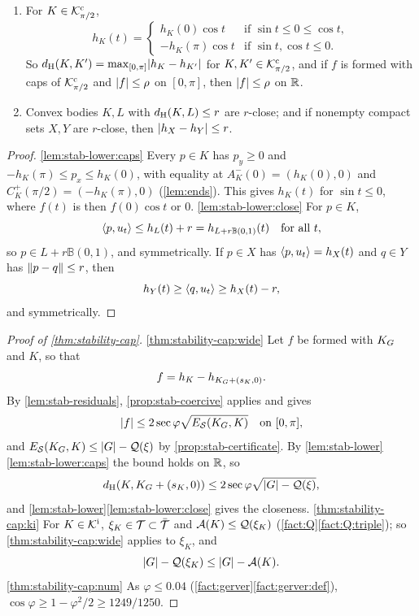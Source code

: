 \begin{lemma}\label{lem:stab-lower}
\begin{enumerate}[label=(\alph*)]
\item\label{lem:stab-lower:caps} For $K\in\mathcal{K}^{\mathrm{c}}_{\pi/2}$,
\[
  h_K(t)=
  \begin{cases}
    h_K(0)\cos t & \text{if }\sin t\le0\le\cos t,\\
    -h_K(\pi)\cos t & \text{if }\sin t,\cos t\le0.
  \end{cases}
\]
So $d_{\mathrm{H}}(K,K')=\max_{[0,\pi]}\lvert h_K-h_{K'}\rvert$ for $K,K'\in\mathcal{K}^{\mathrm{c}}_{\pi/2}$, and if
$f$ is formed with caps of $\mathcal{K}^{\mathrm{c}}_{\pi/2}$ and $\lvert f\rvert\le\rho$ on $[0,\pi]$, then
$\lvert f\rvert\le\rho$ on $\mathbb{R}$.
\item\label{lem:stab-lower:close} Convex bodies $K,L$ with $d_{\mathrm{H}}(K,L)\le r$
are $r$-close; and if nonempty compact sets $X,Y$ are $r$-close, then
$\lvert h_X-h_Y\rvert\le r$.
\end{enumerate}
\end{lemma}

\begin{proof}
\ref{lem:stab-lower:caps} Every $p\in K$ has $p_y\ge0$ and
$-h_K(\pi)\le p_x\le h_K(0)$, with equality at $A^-_K(0)=(h_K(0),0)$ and
$C^+_K(\pi/2)=(-h_K(\pi),0)$ (\cref{lem:ends}). This gives $h_K(t)$ for
$\sin t\le0$, where $f(t)$ is then $f(0)\cos t$ or $0$.
\ref{lem:stab-lower:close} For $p\in K$,
\[
  \langle p,u_t\rangle\le h_L(t)+r=h_{L+r\mathbb B(0,1)}(t)\quad\text{for all }t,
\]
so $p\in L+r\mathbb B(0,1)$, and symmetrically. If $p\in X$ has
$\langle p,u_t\rangle=h_X(t)$ and $q\in Y$ has $\lVert p-q\rVert\le r$, then
\[
  h_Y(t)\ge\langle q,u_t\rangle\ge h_X(t)-r,
\]
and symmetrically.
\end{proof}

\begin{proof}[Proof of \cref{thm:stability-cap}]
\ref{thm:stability-cap:wide} Let $f$ be formed with $K_G$ and $K$, so that
\[
  f=h_K-h_{K_G+(s_K,0)}.
\]
By \cref{lem:stab-residuals}, \cref{prop:stab-coercive} applies and gives
\[
  \lvert f\rvert\le2\sec\varphi\sqrt{E_{\mathcal{S}}(K_G,K)}\quad\text{on }[0,\pi],
\]
and $E_{\mathcal{S}}(K_G,K)\le\lvert G\rvert-\mathcal{Q}(\xi)$ by \cref{prop:stab-certificate}. By
\cref{lem:stab-lower}\ref{lem:stab-lower:caps} the bound holds on $\mathbb{R}$, so
\[
  d_{\mathrm{H}}(K,K_G+(s_K,0))\le2\sec\varphi\sqrt{\lvert G\rvert-\mathcal{Q}(\xi)},
\]
and \cref{lem:stab-lower}\ref{lem:stab-lower:close} gives the closeness.
\ref{thm:stability-cap:ki} For $K\in\mathcal{K}^{\mathrm{i}}$, $\xi_K\in\mathcal{T}\subset\bar{\mathcal{T}}$ and
$\mathcal{A}(K)\le\mathcal{Q}(\xi_K)$ (\cref{fact:Q}\ref{fact:Q:triple}); so
\ref{thm:stability-cap:wide} applies to $\xi_K$, and
\[
  \lvert G\rvert-\mathcal{Q}(\xi_K)\le\lvert G\rvert-\mathcal{A}(K).
\]
\ref{thm:stability-cap:num} As $\varphi\le0.04$
(\cref{fact:gerver}\ref{fact:gerver:def}),
$\cos\varphi\ge1-\varphi^2/2\ge1249/1250$.
\end{proof}

